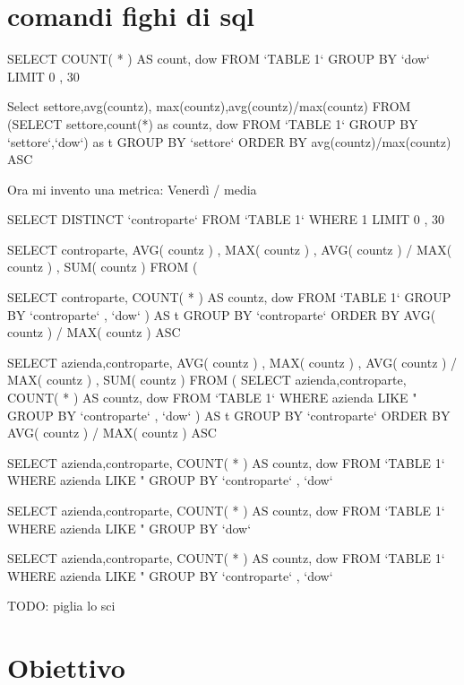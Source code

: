 \documentclass[10pt,a4paper]{article}
\begin{document}
\section{comandi fighi di sql}
SELECT COUNT( * ) AS count, dow
FROM  `TABLE 1` 
GROUP BY  `dow` 
LIMIT 0 , 30

Select settore,avg(countz), max(countz),avg(countz)/max(countz)  FROM (SELECT settore,count(*) as countz, dow FROM `TABLE 1` GROUP BY `settore`,`dow`) as t GROUP BY `settore`
ORDER BY avg(countz)/max(countz) ASC

Ora mi invento una metrica:
Venerdì
/ 
media 


SELECT DISTINCT  `controparte` 
FROM  `TABLE 1` 
WHERE 1 
LIMIT 0 , 30

SELECT controparte, AVG( countz ) , MAX( countz ) , AVG( countz ) / MAX( countz ) , SUM( countz ) 
FROM (

SELECT controparte, COUNT( * ) AS countz, dow
FROM  `TABLE 1` 
GROUP BY  `controparte` ,  `dow`
) AS t
GROUP BY  `controparte` 
ORDER BY AVG( countz ) / MAX( countz ) ASC





SELECT azienda,controparte, AVG( countz ) , MAX( countz ) , AVG( countz ) / MAX( countz ) , SUM( countz ) 
FROM (
SELECT azienda,controparte, COUNT( * ) AS countz, dow
FROM  `TABLE 1` WHERE azienda LIKE "%
GROUP BY  `controparte` ,  `dow`
) AS t
GROUP BY  `controparte` 
ORDER BY AVG( countz ) / MAX( countz ) ASC


SELECT azienda,controparte, COUNT( * ) AS countz, dow
FROM  `TABLE 1` WHERE azienda LIKE "%
GROUP BY  `controparte` ,  `dow`


SELECT azienda,controparte, COUNT( * ) AS countz, dow
FROM  `TABLE 1` WHERE azienda LIKE "%
GROUP BY `dow`

SELECT azienda,controparte, COUNT( * ) AS countz, dow
FROM  `TABLE 1` WHERE azienda LIKE "%
GROUP BY  `controparte` ,  `dow`



TODO: piglia lo sci







\section{Obiettivo}
\end{document}
